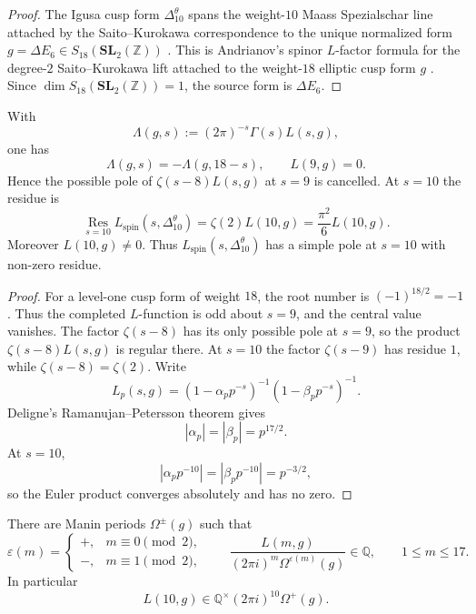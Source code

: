 \documentclass[11pt]{memoir}
\newcommand{\Q}{\mathbb{Q}}
\newcommand{\Z}{\mathbb{Z}} \newcommand{\C}{\mathbb{C}}
\newcommand{\SL}{\mathbf{SL}}
\begin{document}
\begin{proof}
The Igusa cusp form \(\Delta_{10}^{\theta}\) spans the weight-\(10\)
Maass Spezialschar line attached by the Saito--Kurokawa correspondence
to the unique normalized form \(g=\Delta E_6\in S_{18}(\SL_2(\Z))\)
\cite{ZagierSK}.
This is Andrianov's spinor $L$-factor formula for the degree-$2$
Saito--Kurokawa lift attached to the weight-$18$ elliptic cusp form
$g$ \cite{Andr74}.  Since $\dim S_{18}(\SL_2(\Z))=1$, the source form
is $\Delta E_6$.
\end{proof}

\begin{proposition}
\label{prop:sk-central-zero}
With
$$\Lambda(g,s):=(2\pi)^{-s}\Gamma(s)L(s,g),$$
one has
$$\Lambda(g,s)=-\Lambda(g,18-s),\qquad L(9,g)=0.$$
Hence the possible pole of $\zeta(s-8)L(s,g)$ at $s=9$ is cancelled.
At $s=10$ the residue is
$$\operatorname*{Res}_{s=10}L_{\mathrm{spin}}(s,\Delta_{10}^{\theta})
=\zeta(2)L(10,g)=\frac{\pi^2}{6}L(10,g).$$
Moreover \(L(10,g)\ne0\).  Thus
\(L_{\mathrm{spin}}(s,\Delta_{10}^{\theta})\) has a simple pole at
\(s=10\) with non-zero residue.
\end{proposition}

\begin{proof}
For a level-one cusp form of weight $18$, the root number is
$(-1)^{18/2}=-1$.  Thus the completed $L$-function is odd about
$s=9$, and the central value vanishes.  The factor $\zeta(s-8)$ has
its only possible pole at $s=9$, so the product
$\zeta(s-8)L(s,g)$ is regular there.  At $s=10$ the factor
$\zeta(s-9)$ has residue $1$, while $\zeta(s-8)=\zeta(2)$.
Write
$$L_p(s,g)=(1-\alpha_pp^{-s})^{-1}(1-\beta_pp^{-s})^{-1}.$$
Deligne's Ramanujan--Petersson theorem gives
$$|\alpha_p|=|\beta_p|=p^{17/2}.$$
At \(s=10\),
$$|\alpha_pp^{-10}|=|\beta_pp^{-10}|=p^{-3/2},$$
so the Euler product converges absolutely and has no zero.
\end{proof}

\begin{proposition}
\label{prop:manin-deligne-scope}
There are Manin periods $\Omega^\pm(g)$ such that
$$\varepsilon(m)=
\begin{cases}
+,&m\equiv0\pmod 2,\\
-,&m\equiv1\pmod 2,
\end{cases}
\qquad
\frac{L(m,g)}{(2\pi i)^m\Omega^{\varepsilon(m)}(g)}\in\Q,
\qquad 1\leq m\leq17.$$
In particular
$$L(10,g)\in \Q^\times(2\pi i)^{10}\Omega^+(g).$$
\end{proposition}
\end{document}
